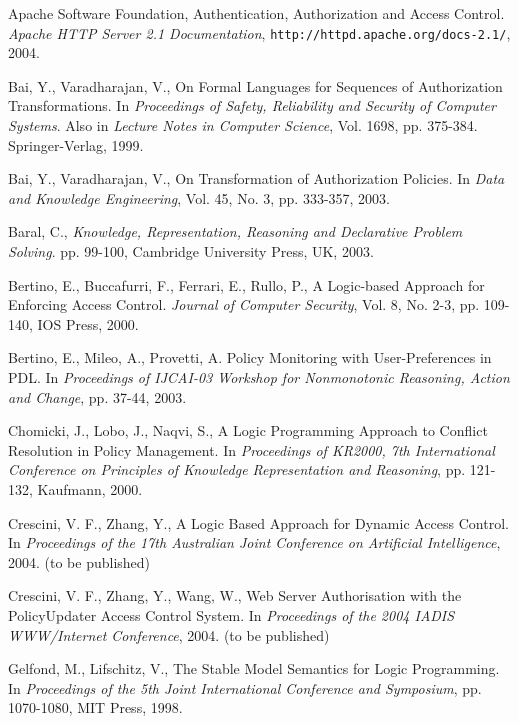 \documentclass[global,twocolumn,final]{svjour}
\begin{document}
  \begin{thebibliography}{5}
      Apache Software Foundation,
      Authentication, Authorization and Access Control.
      {\em Apache HTTP Server 2.1 Documentation},
      {\tt \scriptsize http://httpd.apache.org/docs-2.1/}, 2004.

      Bai, Y., Varadharajan, V.,
      On Formal Languages for Sequences of Authorization Transformations.
      In {\em Proceedings of Safety, Reliability and Security of Computer
      Systems}. Also in {\em Lecture Notes in Computer Science},
      Vol. 1698, pp. 375-384. Springer-Verlag, 1999.

      Bai, Y., Varadharajan, V.,
      On Transformation of Authorization Policies.
      In {\em Data and Knowledge Engineering},
      Vol. 45, No. 3, pp. 333-357, 2003.

      Baral, C.,
      {\em Knowledge, Representation, Reasoning and Declarative Problem
      Solving}.
      pp. 99-100, Cambridge University Press, UK, 2003.

      Bertino, E., Buccafurri, F., Ferrari, E., Rullo, P.,
      A Logic-based Approach for Enforcing Access Control.
      {\em Journal of Computer Security},
      Vol. 8, No. 2-3, pp. 109-140, IOS Press, 2000.

      Bertino, E., Mileo, A., Provetti, A.
      Policy Monitoring with User-Preferences in PDL.
      In {\em Proceedings of IJCAI-03 Workshop for Nonmonotonic Reasoning,
      Action and Change},
      pp. 37-44, 2003.

      Chomicki, J., Lobo, J., Naqvi, S.,
      A Logic Programming Approach to Conflict Resolution in Policy Management.
      In {\em Proceedings of KR2000, 7th International Conference on Principles
      of Knowledge Representation and Reasoning},
      pp. 121-132, Kaufmann, 2000.

      Crescini, V. F., Zhang, Y.,
      A Logic Based Approach for Dynamic Access Control.
      In {\em Proceedings of the 17th Australian Joint Conference on Artificial
      Intelligence},
      2004. (to be published)

      Crescini, V. F., Zhang, Y., Wang, W.,
      Web Server Authorisation with the PolicyUpdater Access Control System.
      In {\em Proceedings of the 2004 IADIS WWW/Internet Conference},
      2004. (to be published)

      Gelfond, M., Lifschitz, V.,
      The Stable Model Semantics for Logic Programming.
      In {\em Proceedings of the 5th Joint International Conference and
      Symposium},
      pp. 1070-1080, MIT Press, 1998.


\end{thebibliography}
\end{document}
